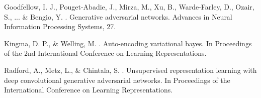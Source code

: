 \documentclass[12pt,a4paper]{article}
\begin{document}

\begin{thebibliography}{99}

Goodfellow, I. J., Pouget-Abadie, J., Mirza, M., Xu, B., Warde-Farley, D., Ozair, S., ... \& Bengio, Y. . Generative adversarial networks. Advances in Neural Information Processing Systems, 27.

Kingma, D. P., \& Welling, M. . Auto-encoding variational bayes. In Proceedings of the 2nd International Conference on Learning Representations.

Radford, A., Metz, L., \& Chintala, S. . Unsupervised representation learning with deep convolutional generative adversarial networks. In Proceedings of the International Conference on Learning Representations.

\end{thebibliography}
\end{document}
